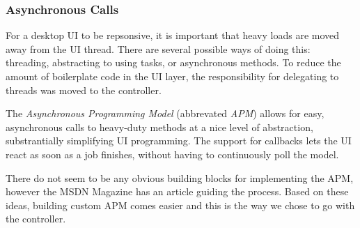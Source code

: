 \subsubsection{Asynchronous Calls}

For a desktop UI to be repsonsive, it is important that heavy loads are moved away from the UI thread. There are several possible ways of doing this: threading, abstracting to using tasks, or asynchronous methods. To reduce the amount of boilerplate code in the UI layer, the responsibility for delegating to threads was moved to the controller.

The \emph{Asynchronous Programming Model}\cite{msdnAPMdoc} (abbrevated \emph{APM}) allows for easy, asynchronous calls to heavy-duty methods at a nice level of abstraction, substrantially simplifying UI programming. The support for callbacks lets the UI react as soon as a job finishes, without having to continuously poll the model.

There do not seem to be any obvious building blocks for implementing the APM, however the MSDN Magazine\cite{richtermsdn0307} has an article guiding the process. Based on these ideas, building custom APM comes easier and this is the way we chose to go with the controller.